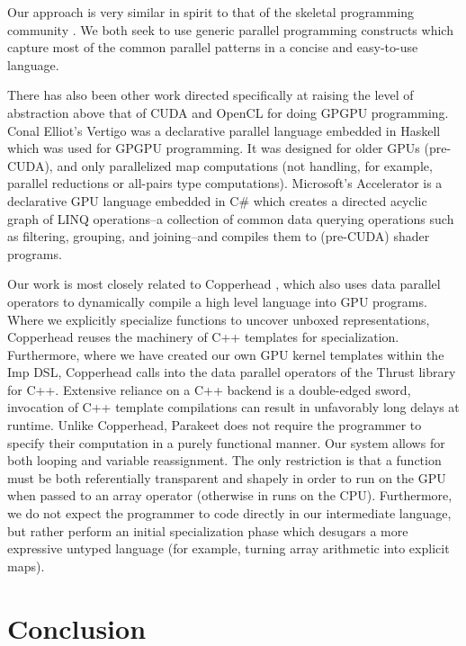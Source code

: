 \documentclass[preprint]{sigplanconf}
\begin{document}
Our approach is very similar in spirit to that of the skeletal programming
community \cite{Cole04}.  We both seek to use generic parallel programming
constructs which capture most of the common parallel patterns in a concise and
easy-to-use language.  

There has also been other work directed specifically at raising the level of
abstraction above that of CUDA and OpenCL for doing GPGPU programming.  Conal
Elliot's Vertigo \cite{Elli04} was a declarative parallel language embedded in
Haskell which was used for GPGPU programming.  It was designed for older GPUs
(pre-CUDA), and only parallelized map computations (not handling, for example,
parallel reductions or all-pairs type computations).  Microsoft's Accelerator
\cite{Tard06} is a declarative GPU language embedded in C\# which creates a
directed acyclic graph of LINQ operations--a collection of common data querying
operations such as filtering, grouping, and joining--and compiles them to
(pre-CUDA) shader programs.  

Our work is most closely related to Copperhead \cite{Cata10}, which also
uses data parallel operators to dynamically compile a high level language into
GPU programs. Where we explicitly specialize functions to uncover unboxed
representations, Copperhead reuses the machinery of C++ templates for
specialization. Furthermore, where we have created our own GPU kernel 
templates within the Imp DSL, Copperhead calls into the data parallel operators
of the Thrust library for C++. Extensive reliance on a C++ backend is a
double-edged sword, invocation of C++ template compilations can result in
unfavorably long delays at runtime. Unlike Copperhead, Parakeet does not require
the programmer to specify their computation in a purely functional manner.
Our system allows for both looping and variable reassignment. The
only restriction is that a function must be both referentially transparent and
shapely in order to run on the GPU when passed to an array operator (otherwise
in runs on the CPU). Furthermore, we do not expect the programmer to code
directly in our intermediate language, but rather perform an initial
specialization phase which desugars a more expressive untyped language (for
example, turning array arithmetic into explicit maps). 
\section{Conclusion}
\label{Conclusion}
\end{document}
